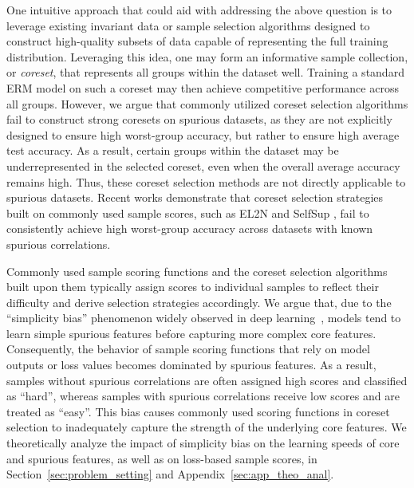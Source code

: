 \documentclass[letter,11pt]{article}
\begin{document}
One intuitive approach that could aid with addressing the above question is to leverage existing invariant data or sample selection algorithms designed to construct high-quality subsets of data capable of representing the full training distribution. Leveraging this idea, one may form an informative sample collection, or \emph{coreset}, that represents all groups within the dataset well.
Training a standard ERM model on such a coreset may then achieve competitive performance across all groups. However, we argue that commonly utilized coreset selection algorithms fail to construct strong coresets on spurious datasets, as they are not explicitly designed to ensure high worst-group accuracy, but rather to ensure high average test accuracy. As a result, certain groups within the dataset may be underrepresented in the selected coreset, even when the overall average accuracy remains high. Thus, these coreset selection methods are not directly applicable to spurious datasets. Recent works \citep{CS_LR, DROP} demonstrate that coreset selection strategies built on commonly used sample scores, such as EL2N \citep{EL2N} and SelfSup \citep{SelfSup}, fail to consistently achieve high worst-group accuracy across datasets with known spurious correlations.

Commonly used sample scoring functions and the coreset selection algorithms built upon them typically assign scores to individual samples to reflect their difficulty and derive selection strategies accordingly. We argue that, due to the ``simplicity bias'' phenomenon widely observed in deep learning~\citep{SIMP_BIAS_1, SIMP_BIAS_2, SIMP_BIAS_3, SIMP_BIAS_THEORY}, models tend to learn simple spurious features before capturing more complex core features. Consequently, the behavior of sample scoring functions that rely on model outputs or loss values becomes dominated by spurious features. As a result, samples without spurious correlations are often assigned high scores and classified as ``hard'', whereas samples with spurious correlations receive low scores and are treated as ``easy''. This bias causes commonly used scoring functions in coreset selection to inadequately capture the strength of the underlying core features. We theoretically analyze the impact of simplicity bias on the learning speeds of core and spurious features, as well as on loss-based sample scores, in Section~\ref{sec:problem_setting} and Appendix~\ref{sec:app_theo_anal}.
\end{document}
